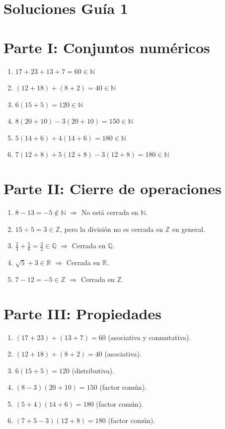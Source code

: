 \documentclass[12pt]{article}
\begin{document}
	
\section*{\centering Soluciones Guía 1}
	
	\section*{Parte I: Conjuntos numéricos}
	
	\begin{enumerate}
		\item $17+23+13+7 = 60 \in \mathbb{N}$
		\item $(12+18)+(8+2) = 40 \in \mathbb{N}$
		\item $6(15+5) = 120 \in \mathbb{N}$
		\item $8(20+10)-3(20+10) = 150 \in \mathbb{N}$
		\item $5(14+6)+4(14+6) = 180 \in \mathbb{N}$
		\item $7(12+8)+5(12+8)-3(12+8) = 180 \in \mathbb{N}$
	\end{enumerate}
	
	\section*{Parte II: Cierre de operaciones}
	
	\begin{enumerate}
		\item $8-13=-5 \notin \mathbb{N}$ $\Rightarrow$ No está cerrada en $\mathbb{N}$.
		\item $15\div5=3 \in \mathbb{Z}$, pero la división no es cerrada en $\mathbb{Z}$ en general.
		\item $\frac{2}{3}+\frac{5}{6}=\frac{3}{2} \in \mathbb{Q}$ $\Rightarrow$ Cerrada en $\mathbb{Q}$.
		\item $\sqrt{5}+3 \in \mathbb{R}$ $\Rightarrow$ Cerrada en $\mathbb{R}$.
		\item $7-12=-5 \in \mathbb{Z}$ $\Rightarrow$ Cerrada en $\mathbb{Z}$.
	\end{enumerate}
	
	\section*{Parte III: Propiedades}
	
	\begin{enumerate}
		\item $(17+23)+(13+7)=60$ (asociativa y conmutativa).
		\item $(12+18)+(8+2)=40$ (asociativa).
		\item $6(15+5)=120$ (distributiva).
		\item $(8-3)(20+10)=150$ (factor común).
		\item $(5+4)(14+6)=180$ (factor común).
		\item $(7+5-3)(12+8)=180$ (factor común).
	\end{enumerate}
	
\end{document}
